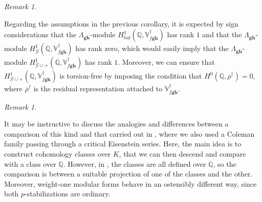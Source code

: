 \documentclass[a4paper,11pt]{amsart}
\theoremstyle{plain}
\theoremstyle{definition}
\theoremstyle{remark}
\newtheorem{remarkwr}[theorem]{Remark}
\newenvironment{remark}{\begin{remarkwr}\begin{upshape}}{\end{upshape}\end{remarkwr}}
\newcommand{\bb}{\mathbb}
\newcommand{\cl}{\mathcal}
\DeclareMathOperator{\bal}{bal}
\newcommand{\hg}{{\mathbf{g}}}
\newcommand{\hh}{{\mathbf h}}
\numberwithin{equation}{section}
\begin{document}
\begin{remark}\label{rk:torsionfreeness}
    Regarding the assumptions in the previous corollary, it is expected by sign considerations that the $\Lambda_{\hg\hh}$-module $H^1_{\bal}(\bb{Q}, \bb{V}_{f\hg\hh}^\dagger)$ has rank $1$ and that the $\Lambda_{\hg\hh}$-module $H^1_{\cl{G}}(\bb{Q}, \bb{V}_{f\hg\hh}^\dagger)$ has rank zero, which would easily imply that the $\Lambda_{\hg\hh}$-module $H^1_{\cl{G}\cup +}(\bb{Q},\bb{V}_{f\hg\hh}^\dagger)$ has rank $1$. Moreover, we can ensure that $H^1_{\cl{G}\cup +}(\bb{Q}, \bb{V}_{f\hg\hh}^\dagger)$ is torsion-free by imposing the condition that $H^0(\bb{Q},\overline{\rho}^\dagger)=0$, where $\overline{\rho}^\dagger$ is the residual representation attached to $\bb{V}_{f\hg \hh}^\dagger$.
\end{remark}


\begin{remark}
It may be instructive to discuss the analogies and differences between a comparison of this kind and that carried out in \cite{LR1}, where we also used a Coleman family passing through a critical Eisenstein series. Here, the main idea is to construct cohomology classes over $K$, that we can then descend and compare with a class over $\mathbb Q$. However, in \cite{LR1}, the classes are all defined over $\mathbb Q$, so the comparison is between a suitable projection of one of the classes and the other.
Moreover, weight-one modular forms behave in an ostensibly different way, since both $p$-stabilizations are ordinary. 
\end{remark}
\end{document}
